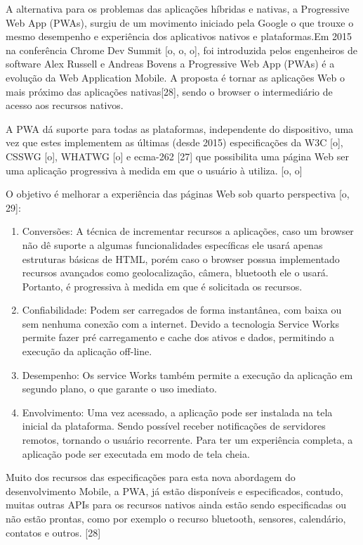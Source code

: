 A alternativa para os problemas  das aplicações híbridas e nativas, a Progressive Web App (PWAs), surgiu de um movimento   iniciado pela Google o que trouxe o mesmo desempenho e experiência dos aplicativos nativos e plataformas.Em 2015 na conferência Chrome Dev Summit [o, o, o], foi introduzida pelos engenheiros de software Alex Russell e Andreas Bovens a Progressive Web App (PWAs) é a evolução da Web Application Mobile. A proposta é tornar as aplicações Web o mais próximo das aplicações nativas[28], sendo o browser o intermediário de acesso aos recursos nativos.

A PWA dá suporte para todas as plataformas, independente do dispositivo, uma vez que estes implementem as últimas (desde 2015) especificações da W3C [o], CSSWG [o], WHATWG [o] e ecma-262 [27] que possibilita uma página Web ser uma aplicação progressiva à medida em que o usuário à utiliza. [o, o]

O objetivo é melhorar a experiência das páginas Web sob quarto perspectiva [o, 29]:

\begin{enumerate} 
	\item Conversões: A técnica de incrementar recursos a aplicações, caso um browser não dê suporte a algumas funcionalidades específicas ele usará apenas estruturas básicas de HTML, porém caso o browser possua implementado recursos avançados como geolocalização, câmera, bluetooth ele o usará. Portanto, é progressiva à medida em que é solicitada os recursos.
	\item Confiabilidade: Podem ser carregados de forma instantânea, com baixa ou sem nenhuma conexão com a internet. Devido a tecnologia Service Works permite fazer pré carregamento e cache dos ativos e dados, permitindo a execução da aplicação off-line.	
	\item Desempenho: Os service Works também permite a execução da aplicação em segundo plano, o que garante o uso imediato.
	\item Envolvimento: Uma vez acessado, a aplicação pode ser instalada na tela inicial da plataforma. Sendo possível receber notificações de servidores remotos, tornando o usuário recorrente.  Para ter um experiência completa, a aplicação pode ser executada em modo de tela cheia.
\end{enumerate}

Muito dos recursos das especificações para esta nova abordagem do desenvolvimento Mobile, a PWA, já estão disponíveis e especificados, contudo, muitas outras APIs para os recursos nativos ainda estão sendo especificadas ou não estão prontas, como por exemplo o recurso bluetooth, sensores, calendário, contatos e outros. [28]

